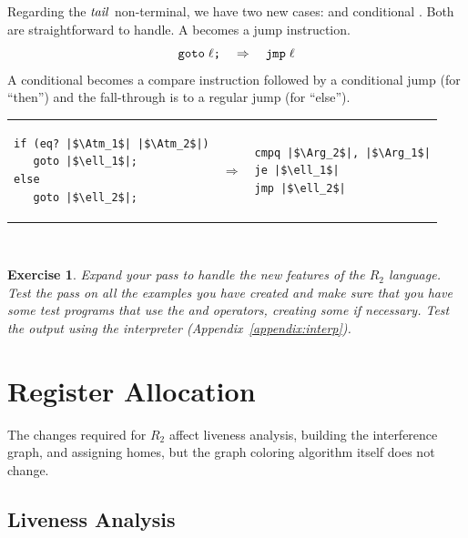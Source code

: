 \documentclass[11pt]{book}
\newtheorem{exercise}[theorem]{Exercise}
\begin{document}
Regarding the $\mathit{tail}$ non-terminal, we have two new cases: 
and conditional . Both are straightforward to handle. A
 becomes a jump instruction.
\[
\texttt{goto}\; \ell\texttt{;} \quad \Rightarrow \quad \texttt{jmp}\;\ell
\]
A conditional  becomes a compare instruction followed
by a conditional jump (for ``then'') and the fall-through is
to a regular jump (for ``else'').\\
\begin{tabular}{lll}
\begin{minipage}{0.4\textwidth}
\begin{lstlisting}
if (eq? |$\Atm_1$| |$\Atm_2$|)
   goto |$\ell_1$|;
else
   goto |$\ell_2$|;
\end{lstlisting}
\end{minipage}
&
$\Rightarrow$
&
\begin{minipage}{0.4\textwidth}
\begin{lstlisting}
cmpq |$\Arg_2$|, |$\Arg_1$|
je |$\ell_1$|
jmp |$\ell_2$|
\end{lstlisting}
\end{minipage}
\end{tabular}  \\

\begin{exercise}\normalfont
Expand your  pass to handle the new features
of the $R_2$ language. Test the pass on all the examples you have
created and make sure that you have some test programs that use the
 and \code{<} operators, creating some if necessary. Test
the output using the  interpreter
(Appendix~\ref{appendix:interp}).
\end{exercise}

\section{Register Allocation}
\label{sec:register-allocation-r2}

The changes required for $R_2$ affect liveness analysis, building the
interference graph, and assigning homes, but the graph coloring
algorithm itself does not change.

\subsection{Liveness Analysis}
\label{sec:liveness-analysis-r2}
\end{document}
